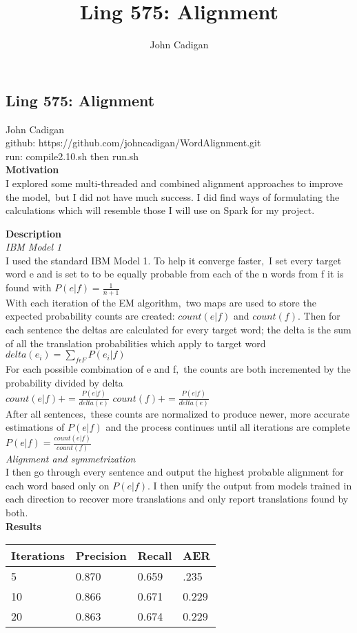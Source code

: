 \documentclass[15pt]{article}
\title{Ling 575: Alignment}
\author{John Cadigan}
\begin{document}
 
\subsection*{Ling 575: Alignment}
John Cadigan\\
github: https://github.com/johncadigan/WordAlignment.git \\
run: compile2.10.sh then run.sh \\

\textbf{Motivation}\\
I explored some multi-threaded and combined alignment approaches to improve the model$,$ but I did not have much success. I did find ways of formulating the calculations which will resemble those I will use on Spark for my project.

\textbf{Description}\\
\textit{IBM Model 1}\\
I used the standard IBM Model 1. To help it converge faster$,$ I set every target word e and is set to to be equally probable from each of the n words from f it is found with
$P(e|f) = \frac{1}{n+1}$ \\
With each iteration of the EM algorithm$,$ two maps are used to store the expected probability counts are created: $count(e|f)$ and $count(f)$. Then for each sentence the deltas are calculated for every target word; the delta is the sum of all the translation probabilities which apply to target word \\
$delta(e_i) = \sum_{f \epsilon F}P(e_i|f)$ \\
For each possible combination of e and f$,$ the counts are both incremented by the probability divided by delta \\
$count(e|f)+= \frac{P(e|f)}{delta(e)}$
$count(f)+= \frac{P(e|f)}{delta(e)}$ \\
After all sentences$,$ these counts are normalized to produce newer, more accurate estimations of $P(e|f)$ and the process continues until all iterations are complete \\
$P(e|f)=\frac{count(e|f)}{count(f)}$ \\
\textit{Alignment and symmetrization}\\
I then go through every sentence and output the highest probable alignment for each word based only on $P(e|f)$. I then unify the output from models trained in each direction to recover more translations and only report translations found by both.  \\
\textbf{Results}\\
    \begin{tabular}{| l| l | l | l |}
    \hline
     Iterations & Precision & Recall & AER \\ \hline
    5 & 0.870 & 0.659 & .235 \\ \hline
	10 & 0.866 &  0.671 & 0.229 \\ \hline
    20 & 0.863 &  0.674 & 0.229 \\ \hline
    \end{tabular} \\
\\  
\end{document}
